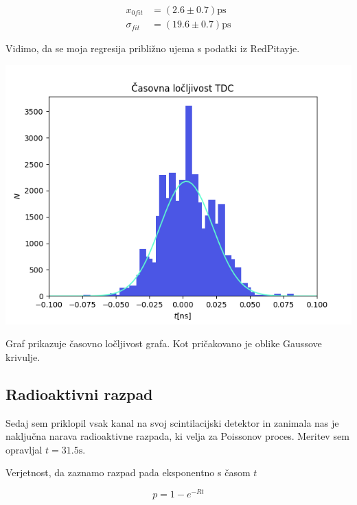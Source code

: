 \documentclass[11pt]{article}
\begin{document}
\begin{align*}
x_{0fit} &= (2.6 \pm 0.7) \mathrm{ps} \\
\sigma_{fit} &= (19.6 \pm 0.7) \mathrm{ps}
\end{align*}

Vidimo, da se moja regresija približno ujema s podatki iz RedPitayje.

\begin{slika}[H]
  \centering
  \includegraphics[width=.9\linewidth]{figures/casovna_locljivost.png}
  \caption{\small Graf prikazuje časovno ločljivost grafa. Kot pričakovano je oblike Gaussove krivulje.}\label{fig:casloc}
\end{slika}

\subsection{Radioaktivni razpad}\label{sec:orgb5a1d2e}

Sedaj sem priklopil vsak kanal na svoj scintilacijski detektor in zanimala nas je naključna narava radioaktivne razpada, ki velja za Poissonov proces. Meritev sem opravljal \(t = 31.5 \mathrm{s}\).

Verjetnost, da zaznamo razpad pada eksponentno s časom \(t\)

\begin{equation}
\label{eq:1}
p = 1 - e^{-Rt}
\end{equation}
\end{document}
